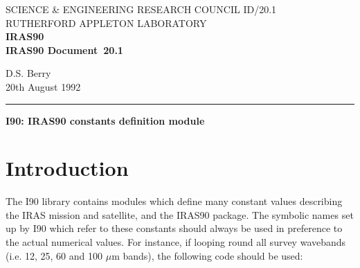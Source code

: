 \pagestyle{myheadings}

\newcommand{\irasdoccategory}  {IRAS90 Document}
\newcommand{\irasdocinitials}  {ID}
\newcommand{\irasdocnumber}    {20.1}
\newcommand{\irasdocauthors}   {D.S. Berry}
\newcommand{\irasdocdate}      {20th August 1992}
\newcommand{\irasdoctitle}     {I90: IRAS90 constants definition module}

\newcommand{\irasdocname}{\irasdocinitials /\irasdocnumber}
\renewcommand{\_}{{\tt\char'137}}     %
\markright{\irasdocname}
\setlength{\textwidth}{160mm}
\setlength{\textheight}{240mm}
\setlength{\topmargin}{-5mm}
\setlength{\oddsidemargin}{0mm}
\setlength{\evensidemargin}{0mm}
\setlength{\parindent}{0mm}
\setlength{\parskip}{\medskipamount}
\setlength{\unitlength}{1mm}



\thispagestyle{empty}
SCIENCE \& ENGINEERING RESEARCH COUNCIL \hfill \irasdocname\\
RUTHERFORD APPLETON LABORATORY\\
{\large\bf IRAS90\\}
{\large\bf \irasdoccategory\ \irasdocnumber}
\begin{flushright}
\irasdocauthors\\
\irasdocdate
\end{flushright}
\vspace{-4mm}
\rule{\textwidth}{0.5mm}
\vspace{5mm}
\begin{center}
{\Large\bf \irasdoctitle}
\end{center}
\vspace{5mm}
\setlength{\parskip}{0mm}
\tableofcontents
\setlength{\parskip}{\medskipamount}
\markright{\irasdocname}

\section {Introduction}

The I90 library contains modules which define many constant values describing
the IRAS mission and satellite, and the IRAS90 package. The symbolic names set
up by I90 which refer to these constants should always be used in preference to
the actual numerical values. For instance, if looping round all survey wavebands
(i.e. 12, 25, 60 and 100 $\mu$m bands), the following code should be used: 

